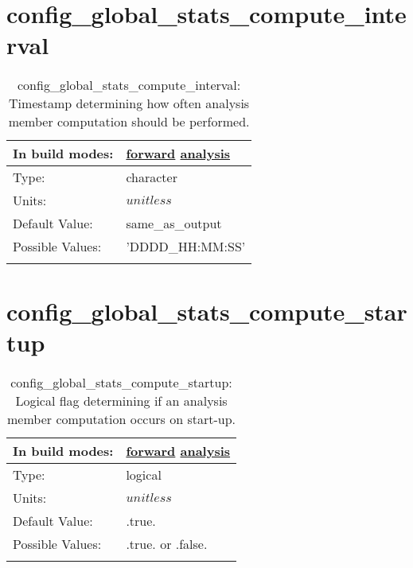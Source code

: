 \section[config\_global\_stats\_compute\_interval]{config\_global\_stats\_compute\_interval}
\label{sec:nm_sec_config_global_stats_compute_interval}
\begin{center}
\begin{longtable}{| p{2.0in} || p{4.0in} |}
    \hline
    In build modes: & \hyperref[subsec:forward_nm_tab_global_stats]{forward} \hyperref[subsec:analysis_nm_tab_global_stats]{analysis} \\
    \hline
    Type: & character \\
    \hline
    Units: & $unitless$ \\
    \hline
    Default Value: & same\_as\_output \\
    \hline
    Possible Values: & 'DDDD\_HH:MM:SS' \\
    \hline
    \caption{config\_global\_stats\_compute\_interval: Timestamp determining how often analysis member computation should be performed.}
\end{longtable}
\end{center}
\section[config\_global\_stats\_compute\_startup]{config\_global\_stats\_compute\_startup}
\label{sec:nm_sec_config_global_stats_compute_startup}
\begin{center}
\begin{longtable}{| p{2.0in} || p{4.0in} |}
    \hline
    In build modes: & \hyperref[subsec:forward_nm_tab_global_stats]{forward} \hyperref[subsec:analysis_nm_tab_global_stats]{analysis} \\
    \hline
    Type: & logical \\
    \hline
    Units: & $unitless$ \\
    \hline
    Default Value: & .true. \\
    \hline
    Possible Values: & .true. or .false. \\
    \hline
    \caption{config\_global\_stats\_compute\_startup: Logical flag determining if an analysis member computation occurs on start-up.}
\end{longtable}
\end{center}
